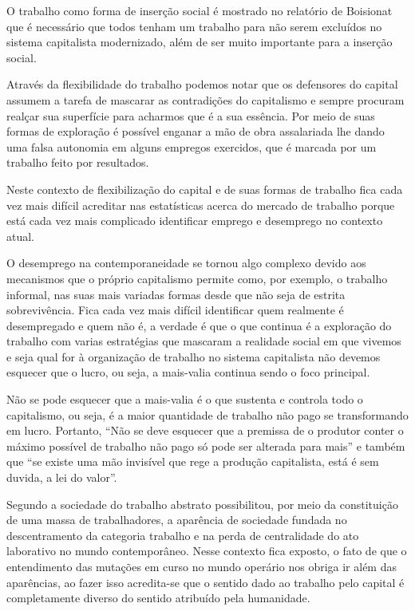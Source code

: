 O trabalho como forma de inserção social é mostrado no relatório de Boisionat que é necessário que 
todos tenham um trabalho para não serem excluídos no sistema capitalista modernizado, além de ser 
muito importante para a inserção social. 

Através da flexibilidade do trabalho podemos notar que os defensores do capital assumem a tarefa 
de mascarar as contradições do capitalismo e sempre procuram realçar sua superfície para acharmos 
que é a sua essência. Por meio de suas formas de exploração é possível enganar a mão de obra 
assalariada lhe dando uma falsa autonomia em alguns empregos exercidos, que é marcada por um 
trabalho feito por resultados. 

Neste contexto de flexibilização do capital e de suas formas de 
trabalho fica cada vez mais difícil acreditar nas estatísticas acerca do mercado de trabalho 
porque está cada vez mais complicado identificar emprego e desemprego no contexto atual.

O desemprego na contemporaneidade se tornou algo complexo devido aos mecanismos que o próprio 
capitalismo permite como, por exemplo, o trabalho informal, nas suas mais variadas formas desde 
que não seja de estrita sobrevivência. Fica cada vez mais difícil identificar quem realmente é 
desempregado e quem não é, a verdade é que o que continua é a exploração do trabalho com varias 
estratégias que mascaram a realidade social em que vivemos e seja qual for à organização de 
trabalho no sistema capitalista não devemos esquecer que o lucro, ou seja, a mais-valia continua 
sendo o foco principal. 

Não se pode esquecer que a mais-valia é o que sustenta e controla todo 
o capitalismo, ou seja, é a maior quantidade de trabalho não pago se transformando em lucro. 
Portanto, ``Não se deve esquecer que a premissa de o produtor conter o máximo possível de trabalho 
não pago só pode ser alterada para mais'' e também que ``se existe uma mão invisível que rege a 
produção capitalista, está é sem duvida, a lei do valor''.

Segundo \cite{antunes1999sentidos} a sociedade do trabalho abstrato possibilitou, por meio da constituição 
de uma massa de trabalhadores, a aparência de sociedade fundada no descentramento da categoria 
trabalho e na perda de centralidade do ato laborativo no mundo contemporâneo. Nesse contexto fica 
exposto, o fato de que o entendimento das mutações em curso no mundo operário nos obriga ir além 
das aparências, ao fazer isso acredita-se que o sentido dado ao trabalho pelo capital é completamente 
diverso do sentido atribuído pela humanidade.

